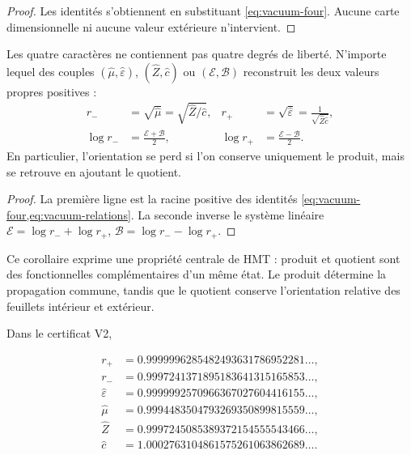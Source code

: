 \begin{proof}
Les identités s'obtiennent en substituant \cref{eq:vacuum-four}. Aucune carte dimensionnelle ni aucune valeur extérieure n'intervient.
\end{proof}

\begin{corollary}
Les quatre caractères ne contiennent pas quatre degrés de liberté. N'importe lequel
des couples \((\widehat\mu,\widehat\varepsilon)\),
\((\widehat Z,\widehat c)\) ou \((\mathcal E,\mathcal B)\) reconstruit les
deux valeurs propres positives :
\begin{align}
r_-&=\sqrt{\widehat\mu}
=\sqrt{\widehat Z/\widehat c},
&r_+&=\sqrt{\widehat\varepsilon}
=\frac1{\sqrt{\widehat Z\widehat c}},
\label{eq:vacuum-reconstruct-r}\\
\log r_-&=\frac{\mathcal E+\mathcal B}{2},
&\log r_+&=\frac{\mathcal E-\mathcal B}{2}.
\label{eq:vacuum-reconstruct-log}
\end{align}
En particulier, l'orientation se perd si l'on conserve uniquement le produit,
mais se retrouve en ajoutant le quotient.
\end{corollary}

\begin{proof}
La première ligne est la racine positive des identités
\cref{eq:vacuum-four,eq:vacuum-relations}. La seconde inverse le système
linéaire
\(\mathcal E=\log r_-+\log r_+\),
\(\mathcal B=\log r_--\log r_+\).
\end{proof}

Ce corollaire exprime une propriété centrale de HMT : produit et quotient sont
des fonctionnelles complémentaires d'un même état. Le produit détermine la
propagation commune, tandis que le quotient conserve l'orientation
relative des feuillets intérieur et extérieur.

Dans le certificat V2,

\begin{align*}
r_+&=0.9999996285482493631786952281\ldots,\\
r_-&=0.9997241371895183641315165853\ldots,\\
\widehat\varepsilon&=0.9999992570966367027604416155\ldots,\\
\widehat\mu&=0.9994483504793269350899815559\ldots,\\
\widehat Z&=0.9997245085389372154555543466\ldots,\\
\widehat c&=1.0002763104861575261063862689\ldots.
\end{align*}

